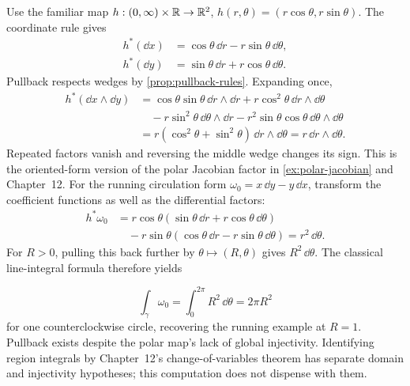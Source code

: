 \begin{example}\label{ex:polar-pullback}
Use the familiar map $h:(0,\infty)\times\mathbb{R}\to\mathbb{R}^2$,
$h(r,\theta)=(r\cos\theta,r\sin\theta)$. The coordinate rule gives
\[
\begin{aligned}
h^*(\dd x)&=\cos\theta\,\dd r-r\sin\theta\,\dd\theta,\\
h^*(\dd y)&=\sin\theta\,\dd r+r\cos\theta\,\dd\theta.
\end{aligned}
\]
Pullback respects wedges by \cref{prop:pullback-rules}. Expanding once,
\[
\begin{aligned}
h^*(\dd x\wedge\dd y)
&=\cos\theta\sin\theta\,\dd r\wedge\dd r
  +r\cos^2\theta\,\dd r\wedge\dd\theta\\
&\quad-r\sin^2\theta\,\dd\theta\wedge\dd r
       -r^2\sin\theta\cos\theta\,\dd\theta\wedge\dd\theta\\
&=r(\cos^2\theta+\sin^2\theta)\,\dd r\wedge\dd\theta
 =r\,\dd r\wedge\dd\theta.
\end{aligned}
\]
Repeated factors vanish and reversing the middle wedge changes its sign.
This is the oriented-form version of the polar Jacobian factor in
\cref{ex:polar-jacobian} and Chapter~12.
For the running circulation form $\omega_0=x\,\dd y-y\,\dd x$, transform
the coefficient functions as well as the differential factors:
\[
\begin{aligned}
h^*\omega_0
&=r\cos\theta(\sin\theta\,\dd r+r\cos\theta\,\dd\theta)\\
&\quad-r\sin\theta(\cos\theta\,\dd r-r\sin\theta\,\dd\theta)
 =r^2\,\dd\theta.
\end{aligned}
\]
For $R>0$, pulling this back further by $\theta\mapsto(R,\theta)$ gives
$R^2\,\dd\theta$. The classical line-integral formula therefore yields

\[
\int_\gamma\omega_0=\int_0^{2\pi}R^2\,\dd\theta=2\pi R^2
\]
 for one
counterclockwise circle, recovering the running example at $R=1$.
Pullback exists despite the polar map's lack of global injectivity.
Identifying region integrals by Chapter~12's change-of-variables theorem
has separate domain and injectivity hypotheses; this computation does not
dispense with them.
\end{example}

